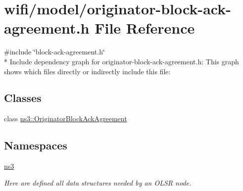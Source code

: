 \hypertarget{originator-block-ack-agreement_8h}{}\section{wifi/model/originator-\/block-\/ack-\/agreement.h File Reference}
\label{originator-block-ack-agreement_8h}
{\ttfamily \#include \char`\"{}block-\/ack-\/agreement.\+h\char`\"{}}\\*
Include dependency graph for originator-\/block-\/ack-\/agreement.h\+:
This graph shows which files directly or indirectly include this file\+:
\subsection*{Classes}
\begin{DoxyCompactItemize}
\item 
class \hyperlink{classns3_1_1OriginatorBlockAckAgreement}{ns3\+::\+Originator\+Block\+Ack\+Agreement}
\end{DoxyCompactItemize}
\subsection*{Namespaces}
\begin{DoxyCompactItemize}
\item 
 \hyperlink{namespacens3}{ns3}
\begin{DoxyCompactList}\small\item\em Here are defined all data structures needed by an O\+L\+SR node. \end{DoxyCompactList}\end{DoxyCompactItemize}
